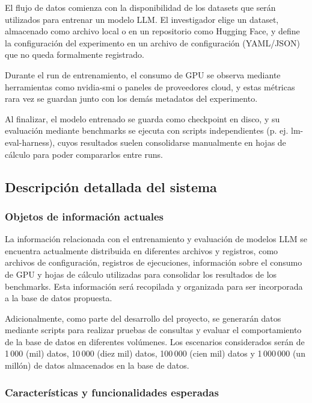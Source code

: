 \documentclass[12pt,a4paper]{article}
\begin{document}
El flujo de datos comienza con la disponibilidad de los datasets que serán utilizados para entrenar un modelo LLM. El investigador elige un dataset, almacenado como archivo local o en un repositorio como Hugging Face, y define la configuración del experimento en un archivo de configuración (YAML/JSON) que no queda formalmente registrado.

Durante el run de entrenamiento, el consumo de GPU se observa mediante herramientas como nvidia-smi o paneles de proveedores cloud, y estas métricas rara vez se guardan junto con los demás metadatos del experimento.

Al finalizar, el modelo entrenado se guarda como checkpoint en disco, y su evaluación mediante benchmarks se ejecuta con scripts independientes (p. ej. lm-eval-harness), cuyos resultados suelen consolidarse manualmente en hojas de cálculo para poder compararlos entre runs.

\subsection{Descripción detallada del sistema}

\subsubsection{Objetos de información actuales}

La información relacionada con el entrenamiento y evaluación de modelos LLM se encuentra actualmente distribuida en diferentes archivos y registros, como archivos de configuración, registros de ejecuciones, información sobre el consumo de GPU y hojas de cálculo utilizadas para consolidar los resultados de los benchmarks. Esta información será recopilada y organizada para ser incorporada a la base de datos propuesta.


Adicionalmente, como parte del desarrollo del proyecto, se generarán datos mediante scripts para realizar pruebas de consultas y evaluar el comportamiento de la base de datos en diferentes volúmenes. Los escenarios considerados serán de 1\,000 (mil) datos, 10\,000 (diez mil) datos, 100\,000 (cien mil) datos y 1\,000\,000 (un millón) de datos almacenados en la base de datos.

\subsubsection{Características y funcionalidades esperadas}
\end{document}
